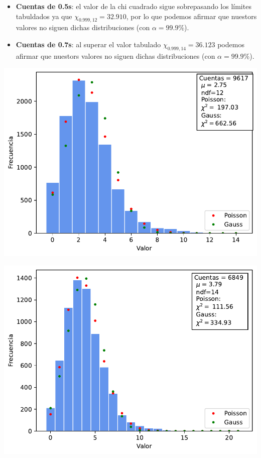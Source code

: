 \documentclass[11pt]{article}
\begin{document}
\begin{itemize}
	\item \textbf{Cuentas de 0.5s}: el valor de la chi cuadrado sigue sobrepasando los límites tabuldados ya que $\chi_{0.999,12}= 32.910$, por lo que podemos afirmar que nuestors valores no siguen dichas distribuciones (con $\alpha=99.9$\%).
	\item \textbf{Cuentas de 0.7s}: al superar el valor tabulado $\chi_{0.999,14}=36.123$ podemos afirmar que nuestors valores no siguen dichas distribuciones (con $\alpha=99.9$\%).
\end{itemize}


\begin{minipage}[t]{0.5\linewidth}
\begin{center}
	\label{Fig:5ms}
	\includegraphics[width=1\linewidth]{../Graficas/Histo_5ms.pdf}
\end{center}
\end{minipage}	
\hfill
\begin{minipage}[t]{0.5\linewidth}
\begin{center}
	\label{Fig:7ms}
	\includegraphics[width=1\linewidth]{../Graficas/Histo_7ms.pdf}
\end{center}
\end{minipage}	
\end{document}
